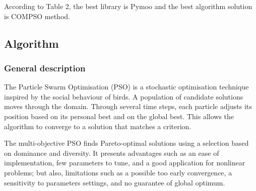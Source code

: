 \begin{table}[h!]
\centering
\caption{Ranking of possible solutions}
\end{table}

According to Table 2, the best library is Pymoo and the best algorithm solution is COMPSO method.

\subsection{Algorithm}

\subsubsection{General description}

The Particle Swarm Optimisation (PSO) is a stochastic optimisation technique inspired by the social behaviour of birds. A population of candidate solutions moves through the domain. Through several time steps, each particle adjusts its position based on its personal best and on the global best. This allows the algorithm to converge to a solution that matches a criterion.

The multi-objective PSO finds Pareto-optimal solutions using a selection based on dominance and diversity. It presents advantages such as an ease of implementation, few parameters to tune, and a good application for nonlinear problems; but also, limitations such as a possible too early convergence, a sensitivity to parameters settings, and no guarantee of global optimum.

